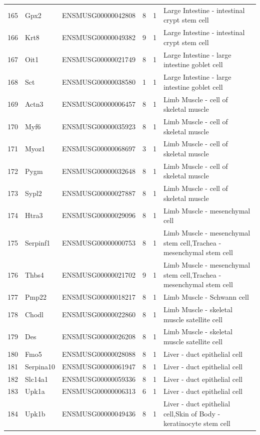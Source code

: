\begin{table}[ht]
{\begin{tabular}{lllrrl}
        165 & Gpx2 & ENSMUSG00000042808 & 8 & 1 & Large Intestine - intestinal crypt stem cell \\
        166 & Krt8 & ENSMUSG00000049382 & 9 & 1 & Large Intestine - intestinal crypt stem cell \\
        167 & Oit1 & ENSMUSG00000021749 & 8 & 1 & Large Intestine - large intestine goblet cell \\
        168 & Sct & ENSMUSG00000038580 & 1 & 1 & Large Intestine - large intestine goblet cell \\
        169 & Actn3 & ENSMUSG00000006457 & 8 & 1 & Limb Muscle - cell of skeletal muscle \\
        170 & Myf6 & ENSMUSG00000035923 & 8 & 1 & Limb Muscle - cell of skeletal muscle \\
        171 & Myoz1 & ENSMUSG00000068697 & 3 & 1 & Limb Muscle - cell of skeletal muscle \\
        172 & Pygm & ENSMUSG00000032648 & 8 & 1 & Limb Muscle - cell of skeletal muscle \\
        173 & Sypl2 & ENSMUSG00000027887 & 8 & 1 & Limb Muscle - cell of skeletal muscle \\
        174 & Htra3 & ENSMUSG00000029096 & 8 & 1 & Limb Muscle - mesenchymal cell \\
        175 & Serpinf1 & ENSMUSG00000000753 & 8 & 1 & Limb Muscle - mesenchymal stem cell,Trachea - mesenchymal stem cell \\
        176 & Thbs4 & ENSMUSG00000021702 & 9 & 1 & Limb Muscle - mesenchymal stem cell,Trachea - mesenchymal stem cell \\
        177 & Pmp22 & ENSMUSG00000018217 & 8 & 1 & Limb Muscle - Schwann cell \\
        178 & Chodl & ENSMUSG00000022860 & 8 & 1 & Limb Muscle - skeletal muscle satellite cell \\
        179 & Des & ENSMUSG00000026208 & 8 & 1 & Limb Muscle - skeletal muscle satellite cell \\
        180 & Fmo5 & ENSMUSG00000028088 & 8 & 1 & Liver - duct epithelial cell \\
        181 & Serpina10 & ENSMUSG00000061947 & 8 & 1 & Liver - duct epithelial cell \\
        182 & Slc14a1 & ENSMUSG00000059336 & 8 & 1 & Liver - duct epithelial cell \\
        183 & Upk1a & ENSMUSG00000006313 & 6 & 1 & Liver - duct epithelial cell \\
        184 & Upk1b & ENSMUSG00000049436 & 8 & 1 & Liver - duct epithelial cell,Skin of Body - keratinocyte stem cell \\

\end{tabular}}
\end{table}
